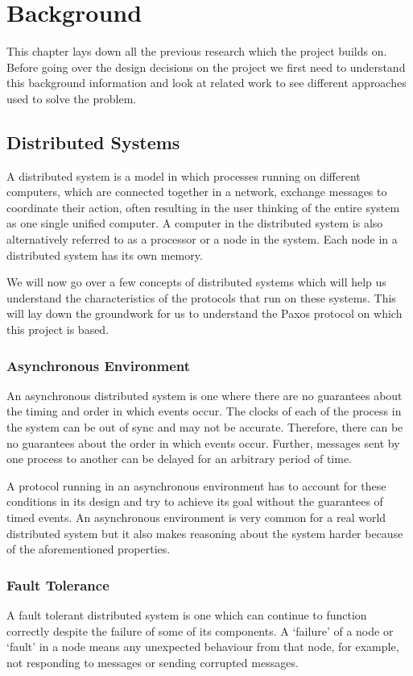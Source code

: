 \chapter{Background}
This chapter lays down all the previous research which the project builds on. Before
going over the design decisions on the project we first need to understand this
background information and look at related work to see different approaches used
to solve the problem.

\section{Distributed Systems}
A distributed system is a model in which processes running on different
computers, which are connected together in a network, exchange messages to coordinate
their action, often resulting in the user thinking of the entire system as one single
unified computer. A computer in the distributed system is also alternatively referred to as a
processor or a node in the system. Each node in a distributed system has its
own memory.

We will now go over a few concepts of distributed systems which will help us understand
the characteristics of the protocols that run on these systems. This will lay down the
groundwork for us to understand the Paxos protocol on which this project is based.

\subsection{Asynchronous Environment}
An asynchronous distributed system is one where there are no guarantees about the
timing and order in which events occur.
The clocks of each of the process in the system can be out of sync and may not be
accurate. Therefore, there can be no guarantees about the order in which events occur.
Further, messages sent by one process to another can be delayed for an arbitrary period of time.

A protocol running in an asynchronous environment has to account for these conditions
in its design and try to achieve its goal without the guarantees of timed events.
An asynchronous environment is very common for a real world distributed system but
it also makes reasoning about the system harder because of the aforementioned properties.

\subsection{Fault Tolerance}
A fault tolerant distributed system is one which can continue to function correctly
despite the failure of some of its components. A `failure' of a node or `fault' in a node
means any unexpected behaviour from that node, for example, not responding to messages
or sending corrupted messages.

